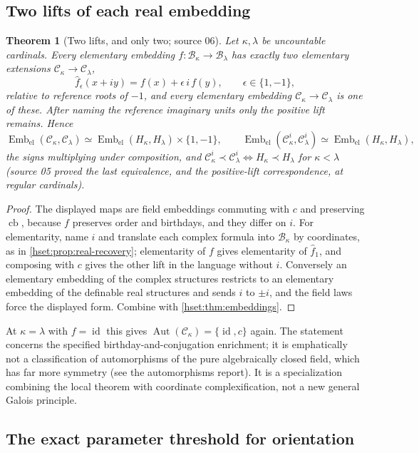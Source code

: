 \documentclass[11pt,letterpaper]{article}
\newtheorem{theorem}{Theorem}[section]
\theoremstyle{definition}
\theoremstyle{remark}
\newcommand{\B}{\mathcal B}
\newcommand{\C}{\mathcal C}
\newcommand{\id}{\operatorname{id}}
\newcommand{\Aut}{\operatorname{Aut}}
\newcommand{\Emb}{\operatorname{Emb}_{\mathrm{el}}}
\newcommand{\cb}{\operatorname{cb}}
\begin{document}
\subsection{Two lifts of each real embedding}

\begin{theorem}[Two lifts, and only two; source 06]\label{hset:thm:two-lifts}
Let $\kappa,\lambda$ be uncountable cardinals. Every elementary embedding
$f:\B_\kappa\to\B_\lambda$ has exactly two elementary extensions
$\C_\kappa\to\C_\lambda$,
\[
 \widehat f_\epsilon(x+iy)=f(x)+\epsilon\,i\,f(y),\qquad\epsilon\in\{1,-1\},
\]
relative to reference roots of $-1$, and every elementary embedding
$\C_\kappa\to\C_\lambda$ is one of these. After naming the reference imaginary
units only the positive lift remains. Hence
\[
 \Emb(\C_\kappa,\C_\lambda)\simeq\Emb(H_\kappa,H_\lambda)\times\{1,-1\},
 \qquad
 \Emb(\C^i_\kappa,\C^i_\lambda)\simeq\Emb(H_\kappa,H_\lambda),
\]
the signs multiplying under composition, and $\C^i_\kappa\prec\C^i_\lambda\iff
H_\kappa\prec H_\lambda$ for $\kappa<\lambda$ (source 05 proved the last
equivalence, and the positive-lift correspondence, at regular cardinals).
\end{theorem}
\begin{proof}
The displayed maps are field embeddings commuting with $c$ and preserving
$\cb$, because $f$ preserves order and birthdays, and they differ on $i$. For
elementarity, name $i$ and translate each complex formula into $\B_\kappa$ by
coordinates, as in \cref{hset:prop:real-recovery}; elementarity of $f$ gives
elementarity of $\widehat f_1$, and composing with $c$ gives the other lift in
the language without $i$. Conversely an elementary embedding of the complex
structures restricts to an elementary embedding of the definable real
structures and sends $i$ to $\pm i$, and the field laws force the displayed
form. Combine with \cref{hset:thm:embeddings}.
\end{proof}

At $\kappa=\lambda$ with $f=\id$ this gives $\Aut(\C_\kappa)=\{\id,c\}$ again. The
statement concerns the specified birthday-and-conjugation enrichment; it is
emphatically not a classification of automorphisms of the pure algebraically
closed field, which has far more symmetry (see the automorphisms report). It is
a specialization combining the local theorem with coordinate complexification,
not a new general Galois principle.

\subsection{The exact parameter threshold for orientation}
\end{document}
